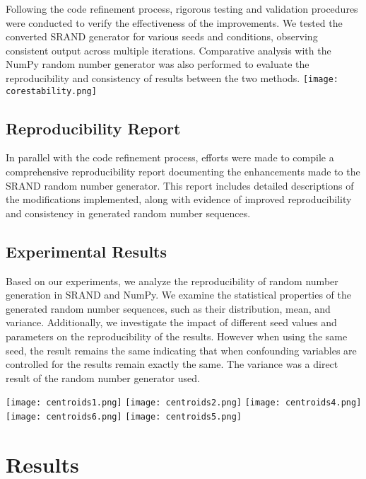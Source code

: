\documentclass{article}
\begin{document}
Following the code refinement process, rigorous testing and validation procedures were conducted to verify the effectiveness of the improvements. We tested the converted SRAND generator for various seeds and conditions, observing consistent output across multiple iterations. Comparative analysis with the NumPy random number generator was also performed to evaluate the reproducibility and consistency of results between the two methods.
\texttt{[image: corestability.png]}

\subsection*{Reproducibility Report}

In parallel with the code refinement process, efforts were made to compile a comprehensive reproducibility report documenting the enhancements made to the SRAND random number generator. This report includes detailed descriptions of the modifications implemented, along with evidence of improved reproducibility and consistency in generated random number sequences.

\subsection{Experimental Results}

Based on our experiments, we analyze the reproducibility of random number generation in SRAND and NumPy. We examine the statistical properties of the generated random number sequences, such as their distribution, mean, and variance. Additionally, we investigate the impact of different seed values and parameters on the reproducibility of the results. However when using the same seed, the result remains the same indicating that when confounding variables are controlled for the results remain exactly the same. The variance was a direct result of the random number generator used.

\vspace{1cm}

\texttt{[image: centroids1.png]}
\texttt{[image: centroids2.png]}
\texttt{[image: centroids4.png]}
\texttt{[image: centroids6.png]}
\texttt{[image: centroids5.png]}

\section{Results}
\end{document}
